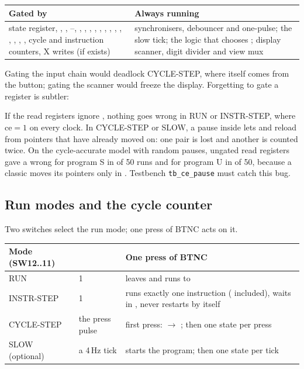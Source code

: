 \begin{center}\small
\begin{tabularx}{\linewidth}{@{}L L@{}}
\toprule
Gated by  & Always running \\
\midrule
state register, , , --, , , , , , , , , , , , , , cycle and instruction counters, X writes (if  exists) &
synchronisers, debouncer and one-pulse; the slow tick; the logic that chooses ; display scanner, digit divider and view mux \\
\bottomrule
\end{tabularx}
\end{center}

Gating the input chain would deadlock CYCLE-STEP, where  itself comes from the button; gating the scanner would freeze the display. Forgetting to gate a register is subtler:

\begin{caution}
If the read registers ignore , nothing goes wrong in RUN or INSTR-STEP, where $\mathrm{ce} = 1$ on every clock. In CYCLE-STEP or SLOW, a pause inside  lets  and  reload from pointers that have already moved on: one pair is lost and another is counted twice. On the cycle-accurate model with random pauses, ungated read registers gave a wrong  for program S in \ungatedS{} of 50 runs and for program U in \ungatedU{} of 50, because a classic  moves its pointers only in . Testbench \texttt{tb\_ce\_pause} must catch this bug.
\end{caution}

\subsection{Run modes and the cycle counter}

Two switches select the run mode; one press of BTNC acts on it.

\begin{center}\small
\begin{tabularx}{\linewidth}{@{}l l L@{}}
\toprule
Mode (SW12..11) &  & One press of BTNC \\
\midrule
RUN & 1 & leaves  and runs to  \\
INSTR-STEP & 1 & runs exactly one instruction ( included), waits in , never restarts by itself \\
CYCLE-STEP & the press pulse & first press:  $\to$ ; then one state per press \\
SLOW (optional) & a 4\,Hz tick & starts the program; then one state per tick \\
\bottomrule
\end{tabularx}
\end{center}


